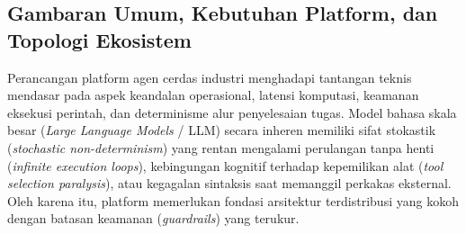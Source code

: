 \subsection{Gambaran Umum, Kebutuhan Platform, dan Topologi Ekosistem}

Perancangan platform agen cerdas industri menghadapi tantangan teknis mendasar pada aspek keandalan operasional, latensi komputasi, keamanan eksekusi perintah, dan determinisme alur penyelesaian tugas. Model bahasa skala besar (\textit{Large Language Models} / LLM) secara inheren memiliki sifat stokastik (\textit{stochastic non-determinism}) yang rentan mengalami perulangan tanpa henti (\textit{infinite execution loops}), kebingungan kognitif terhadap kepemilikan alat (\textit{tool selection paralysis}), atau kegagalan sintaksis saat memanggil perkakas eksternal. Oleh karena itu, platform memerlukan fondasi arsitektur terdistribusi yang kokoh dengan batasan keamanan (\textit{guardrails}) yang terukur.

